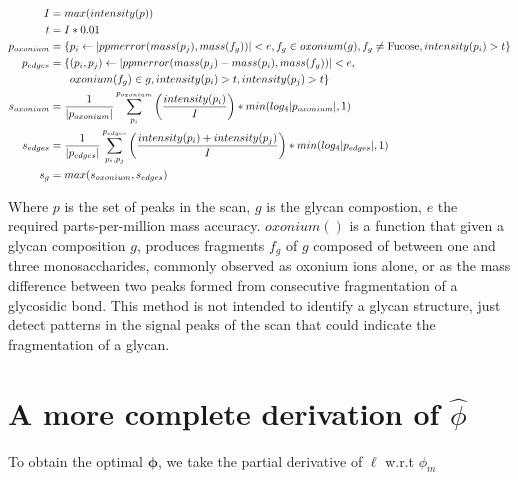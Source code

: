 \documentclass{article}
\begin{document}
    \begin{align}
        I &= max(intensity(p)) \\
        t &= I * 0.01 \\
        p_{oxonium} &= \{p_i \leftarrow |ppmerror(mass(p_j), mass(f_g))| < e,
                         f_g \in oxonium(g), f_g \ne \text{Fucose}, intensity(p_i) > t\}\\
        p_{edges} &= \{(p_i, p_j) \leftarrow |ppmerror(mass(p_j) - mass(p_i), mass(f_g))| < e,\\
                  &\phantom{{}=1} oxonium(f_g) \in g , intensity(p_i) > t, intensity(p_j) > t\} \notag\\
        s_{oxonium} &= \frac{1}{|p_{oxonium}|}\sum_{p_i}^{p_{oxonium}}{
                \left(\frac{intensity(p_i)}{I}\right)
            } * min(log_4|p_{oxonium}|, 1)\\
        s_{edges} &= \frac{1}{|p_{edges}|}\sum_{p_i, p_j}^{p_{edges}}{
                \left(\frac{intensity(p_i) + intensity(p_j)}{I}\right)
            } * min(log_4|p_{edges}|, 1)\\
        s_g &= max(s_{oxonium}, s_{edges})\\
    \end{align}

    Where $p$ is the set of peaks in the scan, $g$ is the glycan compostion, $e$ the
    required parts-per-million mass accuracy. $oxonium()$ is a function that given
    a glycan composition $g$, produces fragments $f_g$ of $g$ composed of between one
    and three monosaccharides, commonly observed as oxonium ions alone, or as the mass
    difference between two peaks formed from consecutive fragmentation of a glycosidic
    bond. This method is not intended to identify a glycan structure, just detect patterns in
    the signal peaks of the \msn scan that could indicate the fragmentation of a glycan.

\section{A more complete derivation of ${\hat \phi}$}\label{sec:phi_hat_derivation}

    To obtain the optimal $\mathbf{\phi}$, we take the partial
        derivative of $\ell$ w.r.t $\phi_m$
\end{document}
